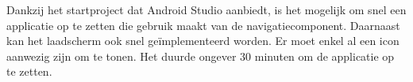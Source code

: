 Dankzij het startproject dat Android Studio aanbiedt, is het mogelijk om snel een applicatie op te zetten 
die gebruik maakt van de navigatiecomponent. Daarnaast kan het laadscherm ook snel geïmplementeerd worden. 
Er moet enkel al een icon aanwezig zijn om te tonen. Het duurde ongever 30 minuten om de applicatie op te
zetten.

